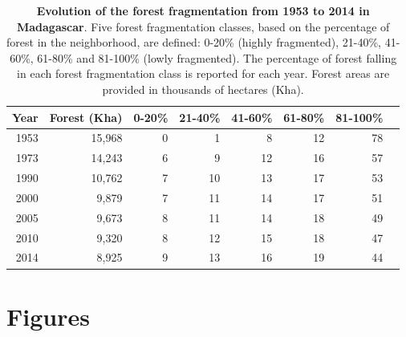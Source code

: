\documentclass[a4paper, 12pt, leqno]{article} %
\begin{document}
\begin{table}[!h]

  \begin{longtable}[]{@{}rrrrrrrr@{}}
    \toprule
    Year & Forest (Kha) & 0-20\% & 21-40\% & 41-60\% &
    61-80\% & 81-100\% \\
    \midrule
    \endhead
    1953  & 15,968  & 0  & 1  & 8  & 12  & 78 \\
    1973  & 14,243  & 6  & 9  & 12  & 16  & 57 \\
    1990  & 10,762  & 7  & 10  & 13  & 17  & 53 \\
    2000  & 9,879  & 7  & 11  & 14  & 17  & 51 \\
    2005  & 9,673  & 8  & 11  & 14  & 18  & 49 \\
    2010  & 9,320  & 8  & 12  & 15  & 18  & 47 \\
    2014  & 8,925  & 9  & 13  & 16  & 19  & 44 \\
    \bottomrule
  \end{longtable}%
  \addtocounter{table}{-1}

  \caption{\textbf{Evolution of the forest fragmentation from 1953 to
      2014 in Madagascar}. Five forest fragmentation classes, based on
    the percentage of forest in the neighborhood, are defined: 0-20\%
    (highly fragmented), 21-40\%, 41-60\%, 61-80\% and 81-100\% (lowly
    fragmented). The percentage of forest falling in each forest
    fragmentation class is reported for each year. Forest areas are
    provided in thousands of hectares (Kha).}

  \label{tab:frag}
\end{table}

\newpage

\section{Figures}
\label{figures}

\nopagebreak
\end{document}
